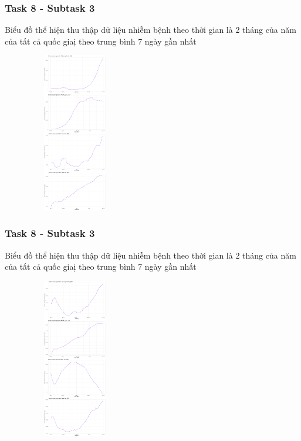 \documentclass[english,10pt,table]{beamer}
\begin{document}
\frame
{
    \frametitle{Task 8 - Subtask 3}
    \begin{block}{Biểu đồ thể hiện thu thập dữ liệu nhiễm bệnh theo thời gian là 2 tháng của năm của tất cả quốc giaị theo trung bình 7 ngày gần nhất}
    \begin{figure}[H]
			\centering
			\includegraphics[height=7cm,width=4.2cm]{images/8.3.1.png}
	\end{figure}
    \end{block}
}
\frame
{
    \frametitle{Task 8 - Subtask 3}
    \begin{block}{Biểu đồ thể hiện thu thập dữ liệu nhiễm bệnh theo thời gian là 2 tháng của năm của tất cả quốc giaị theo trung bình 7 ngày gần nhất}
    \begin{figure}[H]
			\centering
			\includegraphics[height=7cm,width=4.2cm]{images/8.3.2.png}
	\end{figure}
    \end{block}
}
\frame
\end{document}
